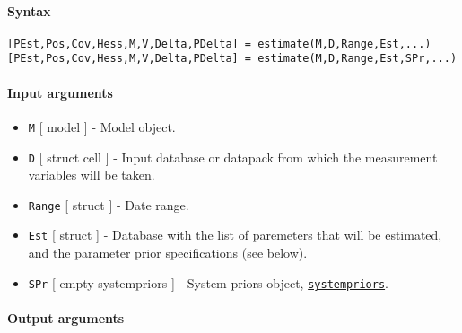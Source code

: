 


	\paragraph{Syntax}\label{syntax}

\begin{verbatim}
[PEst,Pos,Cov,Hess,M,V,Delta,PDelta] = estimate(M,D,Range,Est,...)
[PEst,Pos,Cov,Hess,M,V,Delta,PDelta] = estimate(M,D,Range,Est,SPr,...)
\end{verbatim}

\paragraph{Input arguments}\label{input-arguments}

\begin{itemize}
\item
  \texttt{M} {[} model {]} - Model object.
\item
  \texttt{D} {[} struct \textbar{} cell {]} - Input database or datapack
  from which the measurement variables will be taken.
\item
  \texttt{Range} {[} struct {]} - Date range.
\item
  \texttt{Est} {[} struct {]} - Database with the list of paremeters
  that will be estimated, and the parameter prior specifications (see
  below).
\item
  \texttt{SPr} {[} empty \textbar{} systempriors {]} - System priors
  object, \href{systempriors/Contents}{\texttt{systempriors}}.
\end{itemize}

\paragraph{Output arguments}\label{output-arguments}

